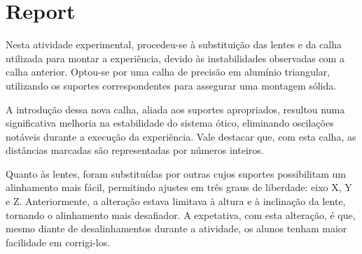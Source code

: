 \documentclass[12pt,a4paper,oneside]{paper}
\begin{document}
\pagestyle{plain}

%
% 



\def\title {Velocidade da Luz}


%
% 

 
\cleardoublepage
{}\selectfont
\setcounter{page}{0}
%
%

\section{Report}
Nesta atividade experimental, procedeu-se à substituição das lentes e da calha utilizada para montar a experiência,
devido às instabilidades observadas com a calha anterior. Optou-se por uma calha de precisão em alumínio triangular, utilizando
os suportes correspondentes para assegurar uma montagem sólida.

A introdução dessa nova calha, aliada aos suportes apropriados, resultou numa significativa melhoria na estabilidade do sistema ótico,
eliminando oscilações notáveis durante a execução da experiência. Vale destacar que, com esta calha, as distâncias marcadas
são representadas por números inteiros.

Quanto às lentes, foram substituídas por outras cujos suportes possibilitam um alinhamento mais fácil, permitindo ajustes
em três graus de liberdade: eixo X, Y e Z. Anteriormente, a alteração estava limitava à altura e à inclinação da lente,
tornando o alinhamento mais desafiador. A expetativa, com esta alteração, é que, mesmo diante de desalinhamentos durante a atividade,
os alunos tenham maior facilidade em corrigi-los.
\end{document}
